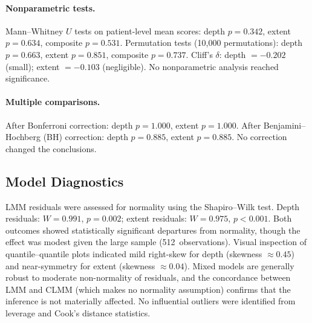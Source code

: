 \paragraph{Nonparametric tests.} Mann--Whitney $U$ tests on patient-level mean scores: depth $p = 0.342$, extent $p = 0.634$, composite $p = 0.531$. Permutation tests (10{,}000 permutations): depth $p = 0.663$, extent $p = 0.851$, composite $p = 0.737$. Cliff's $\delta$: depth $= -0.202$ (small); extent $= -0.103$ (negligible). No nonparametric analysis reached significance.

\paragraph{Multiple comparisons.} After Bonferroni correction: depth $p = 1.000$, extent $p = 1.000$. After Benjamini--Hochberg (BH) correction: depth $p = 0.885$, extent $p = 0.885$. No correction changed the conclusions.

\subsection{Model Diagnostics}

LMM residuals were assessed for normality using the Shapiro--Wilk test. Depth residuals: $W = 0.991$, $p = 0.002$; extent residuals: $W = 0.975$, $p < 0.001$. Both outcomes showed statistically significant departures from normality, though the effect was modest given the large sample (512~observations). Visual inspection of quantile--quantile plots indicated mild right-skew for depth (skewness $\approx 0.45$) and near-symmetry for extent (skewness $\approx 0.04$). Mixed models are generally robust to moderate non-normality of residuals, and the concordance between LMM and CLMM (which makes no normality assumption) confirms that the inference is not materially affected. No influential outliers were identified from leverage and Cook's distance statistics.
